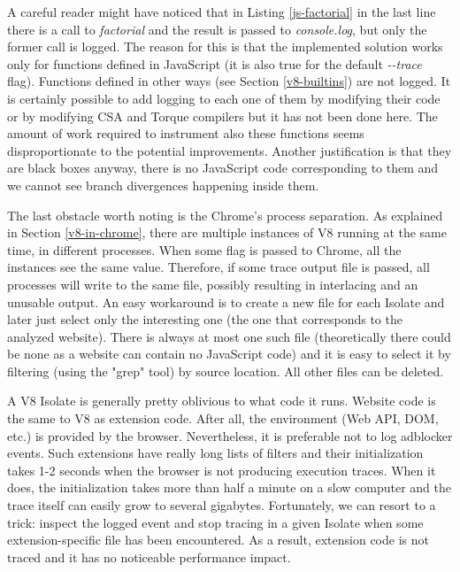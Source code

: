 A careful reader might have noticed that in Listing \ref{js-factorial} in the last line there is a call to \emph{factorial}
and the result is passed to \emph{console.log}, but only the former call is logged.
The reason for this is that the implemented solution works only for functions defined in JavaScript
(it is also true for the default \emph{-{}-trace} flag).
Functions defined in other ways (see Section \ref{v8-builtins}) are not logged. It is certainly possible
to add logging to each one of them by modifying their code or by modifying CSA and Torque compilers
but it has not been done here. The amount of work required to instrument also these functions
seems disproportionate to the potential improvements. Another justification is that they are
black boxes anyway, there is no JavaScript code corresponding to them 
and we cannot see branch divergences happening inside them.

The last obstacle worth noting is the Chrome's process separation. As explained in Section \ref{v8-in-chrome},
there are multiple instances of V8 running at the same time, in different processes.
When some flag is passed to Chrome, all the instances see the same value. Therefore, if some trace output file is passed,
all processes will write to the same file, possibly resulting in interlacing and an unusable output. 
An easy workaround is to create a new file for each Isolate and later just select only the interesting one 
(the one that corresponds to the analyzed website). There is always at most one such file 
(theoretically there could be none as a website can contain no JavaScript code) and it is easy to select it
by filtering (using the "grep" tool) by source location. All other files can be deleted.

A V8 Isolate is generally pretty oblivious to what code it runs. Website code is the same to V8 
as extension code. After all, the environment (Web API, DOM, etc.) is provided by the browser.
Nevertheless, it is preferable not to log adblocker events. Such extensions have really long lists of filters
and their initialization takes 1-2 seconds when the browser is not producing execution traces.
When it does, the initialization takes more than half a minute on a slow computer and the trace itself 
can easily grow to several gigabytes.
Fortunately, we can resort to a trick: inspect the logged event and stop tracing in a given 
Isolate when some extension-specific file has been encountered. As a result, extension code is not
traced and it has no noticeable performance impact.


